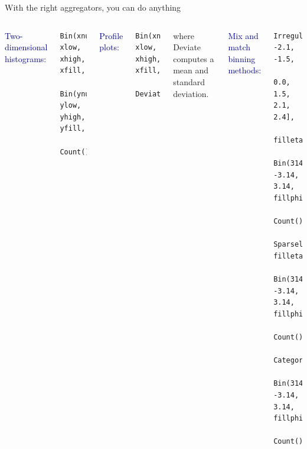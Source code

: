 \documentclass[aspectratio=169]{beamer}
\begin{document}
\begin{frame}[fragile]{With the right aggregators, you can do anything}
\vspace{0.5 cm}
\begin{columns}
\small
\textcolor{darkblue}{\normalsize Two-dimensional histograms:}
\begin{verbatim}
Bin(xnum, xlow, xhigh, xfill,
  Bin(ynum, ylow, yhigh, yfill,
    Count()))
\end{verbatim}

\vspace{1.5 cm}
\textcolor{darkblue}{\normalsize Profile plots:}
\begin{verbatim}
Bin(xnum, xlow, xhigh, xfill,
  Deviate(yfill))
\end{verbatim}

{\normalsize where {\ttfamily\small Deviate} computes a mean and standard deviation.}

\small
\textcolor{darkblue}{\normalsize Mix and match binning methods:}
\begin{verbatim}
IrregularlyBin([-2.4, -2.1, -1.5,
    0.0, 1.5, 2.1, 2.4],
  filleta,
  Bin(314, -3.14, 3.14, fillphi,
    Count()))

SparselyBin(0.01, filleta,
  Bin(314, -3.14, 3.14, fillphi,
    Count()))

Categorize(fillByName,
  Bin(314, -3.14, 3.14, fillphi,
    Count()))
\end{verbatim}
\end{columns}
\end{frame}
\end{document}
